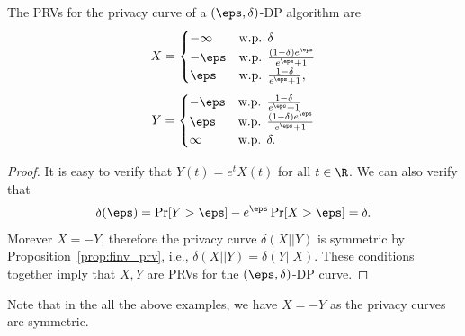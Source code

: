 \begin{proposition}
	The PRVs for the privacy curve of a $(\eps,\delta)$-DP algorithm are
	$$X=\begin{cases}
	-\infty & \text{w.p. } \delta\\
	-\eps & \text{w.p. }  \frac{(1-\delta)e^\eps}{e^\eps+1}\\
	\eps & \text{w.p. } \frac{1-\delta}{e^\eps+1},
	\end{cases}$$
	$$Y=\begin{cases}
	-\eps & \text{w.p. } \frac{1-\delta}{e^\eps+1}\\
	\eps & \text{w.p. }  \frac{(1-\delta)e^\eps}{e^\eps+1}\\
	\infty & \text{w.p. } \delta.
	\end{cases}$$
\end{proposition}
\begin{proof}
	It is easy to verify that $Y(t)=e^t X(t)$ for all $t\in \R$. We can also verify that $$\delta(\eps)=\Pr[Y> \eps] - e^\eps \Pr[X > \eps]=\delta.$$ Morever $X=-Y$, therefore the privacy curve $\delta(X||Y)$ is symmetric by Proposition~\ref{prop:finv_prv}, i.e., $\delta(X||Y)=\delta(Y||X)$. These conditions together imply that $X,Y$ are PRVs for the $(\eps,\delta)$-DP curve.
\end{proof}



Note that in the all the above examples, we have $X=-Y$ as the privacy curves are symmetric.



